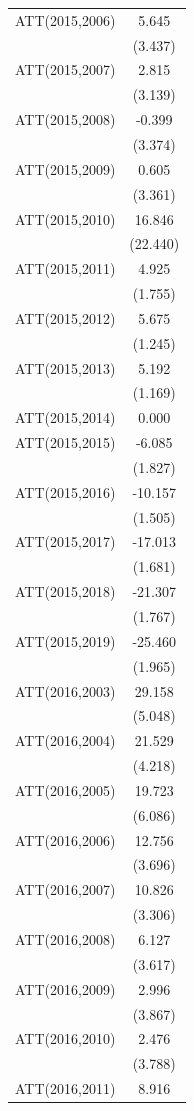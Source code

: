\documentclass[
  12pt,
]{article}
\begin{document}
\begin{table}
\begin{tabular}[t]{lc}
ATT(2015,2006) & 5.645\\
 & (3.437)\\
ATT(2015,2007) & 2.815\\
 & (3.139)\\
ATT(2015,2008) & -0.399\\
 & (3.374)\\
ATT(2015,2009) & 0.605\\
 & (3.361)\\
ATT(2015,2010) & 16.846\\
 & (22.440)\\
ATT(2015,2011) & 4.925\\
 & (1.755)\\
ATT(2015,2012) & 5.675\\
 & (1.245)\\
ATT(2015,2013) & 5.192\\
 & (1.169)\\
ATT(2015,2014) & 0.000\\
ATT(2015,2015) & -6.085\\
 & (1.827)\\
ATT(2015,2016) & -10.157\\
 & (1.505)\\
ATT(2015,2017) & -17.013\\
 & (1.681)\\
ATT(2015,2018) & -21.307\\
 & (1.767)\\
ATT(2015,2019) & -25.460\\
 & (1.965)\\
ATT(2016,2003) & 29.158\\
 & (5.048)\\
ATT(2016,2004) & 21.529\\
 & (4.218)\\
ATT(2016,2005) & 19.723\\
 & (6.086)\\
ATT(2016,2006) & 12.756\\
 & (3.696)\\
ATT(2016,2007) & 10.826\\
 & (3.306)\\
ATT(2016,2008) & 6.127\\
 & (3.617)\\
ATT(2016,2009) & 2.996\\
 & (3.867)\\
ATT(2016,2010) & 2.476\\
 & (3.788)\\
ATT(2016,2011) & 8.916\\

\end{tabular}
\end{table}
\end{document}
